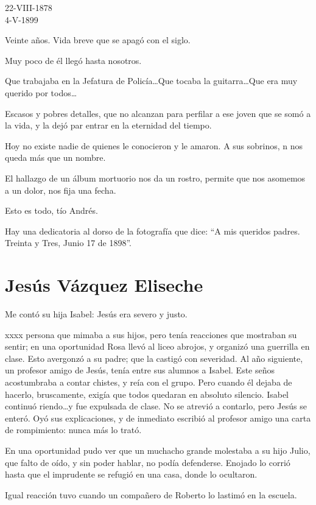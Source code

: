 \documentclass{article}
\begin{document}
22-VIII-1878\\
4-V-1899

Veinte años. Vida breve que se apagó con el siglo.

Muy poco de él llegó hasta nosotros.

Que trabajaba en la Jefatura de Policía\ldots Que tocaba la guitarra\ldots Que era muy querido por todos\ldots

Escasos y pobres detalles, que no alcanzan para perfilar a ese joven que se somó a la vida, y la dejó par entrar en la eternidad del tiempo.

Hoy no existe nadie de quienes le conocieron y le amaron. A sus sobrinos, n nos queda más que un nombre.

El hallazgo de un álbum mortuorio nos da un rostro, permite que nos asomemos a un dolor, nos fija una fecha.

Esto es todo, tío Andrés.

Hay una dedicatoria al dorso de la fotografía que dice: ``A mis queridos padres. Treinta y Tres, Junio 17 de 1898''.

\section{Jesús Vázquez Eliseche}

Me contó su hija Isabel: Jesús era severo y justo.\ 

xxxx persona que mimaba a sus hijos, pero tenía reacciones que mostraban su sentir; en una oportunidad Rosa llevó al liceo abrojos, y organizó una guerrilla en clase. Esto avergonzó a su padre; que la castigó con severidad. Al año siguiente, un profesor amigo de Jesús, tenía entre sus alumnos a Isabel. Este seños acostumbraba a contar chistes, y reía con el grupo. Pero cuando él dejaba de hacerlo, bruscamente, exigía que todos quedaran en absoluto silencio. Isabel continuó riendo\ldots y fue expulsada de clase. No se atrevió a contarlo, pero Jesús se enteró. Oyó sus explicaciones, y de inmediato escribió al profesor amigo una carta de rompimiento: nunca más lo trató.

\bigbreak{}

En una oportunidad pudo ver que un muchacho grande molestaba a su hijo Julio, que falto de oído, y sin poder hablar, no podía defenderse. Enojado lo corrió hasta que el imprudente se refugió en una casa, donde lo ocultaron.

Igual reacción tuvo cuando un compañero de Roberto lo lastimó en la escuela.
\end{document}

